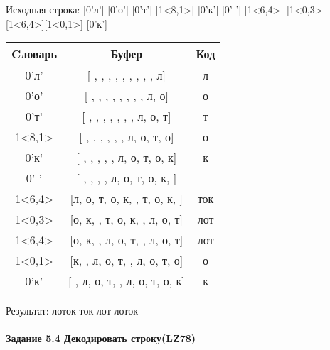 \documentclass[a4paper, 12pt]{article}
\begin{document}
Исходная строка: [0'л'] [0'о'] [0'т'] [1<8,1>] [0'к'] [0' '] [1<6,4>] [1<0,3>] [1<6,4>][1<0,1>] [0'к']\\
\begin{table}[h!]
\centering
\begin{tabular}{|c|c|c|}
\hline
 Cловарь & Буфер & Код  \\ \hline
0'л' & [ ,  ,  ,  ,  ,  ,  ,  ,  , л] & л
\\ \hline
0'о' & [ ,  ,  ,  ,  ,  ,  ,  , л, о] & о
\\ \hline
0'т' & [ ,  ,  ,  ,  ,  ,  , л, о, т] & т
\\ \hline
1<8,1> & [ ,  ,  ,  ,  ,  , л, о, т, о] & о
\\ \hline
0'к' & [ ,  ,  ,  ,  , л, о, т, о, к] & к
\\ \hline
0' ' & [ ,  ,  ,  , л, о, т, о, к,  ] &  
\\ \hline
1<6,4> & [л, о, т, о, к,  , т, о, к,  ] & ток 
\\ \hline
1<0,3> & [о, к,  , т, о, к,  , л, о, т] & лот
\\ \hline
1<6,4> & [о, к,  , л, о, т,  , л, о, т] &  лот
\\ \hline
1<0,1> & [к,  , л, о, т,  , л, о, т, о] & о
\\ \hline
0'к' & [ , л, о, т,  , л, о, т, о, к] & к
\\ \hline
\end{tabular}
\end{table}

Результат: лоток ток лот лоток
\pagebreak
\paragraph{Задание 5.4 Декодировать строку(LZ78)\\}
\end{document}
